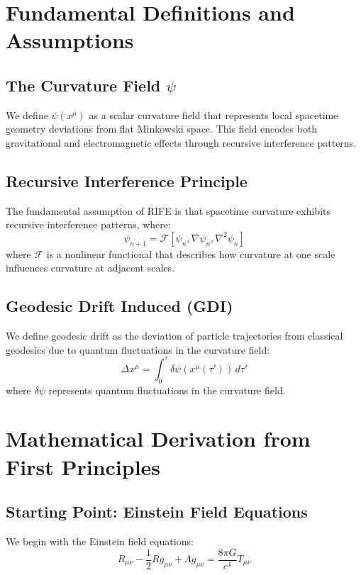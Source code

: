 \documentclass[11pt]{article}
\begin{document}
\section{Fundamental Definitions and Assumptions}

\subsection{The Curvature Field $\psi$}
We define $\psi(x^\mu)$ as a scalar curvature field that represents local spacetime geometry deviations from flat Minkowski space. This field encodes both gravitational and electromagnetic effects through recursive interference patterns.

\subsection{Recursive Interference Principle}
The fundamental assumption of RIFE is that spacetime curvature exhibits recursive interference patterns, where:
\begin{equation}
\psi_{n+1} = \mathcal{F}[\psi_n, \nabla\psi_n, \nabla^2\psi_n]
\end{equation}
where $\mathcal{F}$ is a nonlinear functional that describes how curvature at one scale influences curvature at adjacent scales.

\subsection{Geodesic Drift Induced (GDI)}
We define geodesic drift as the deviation of particle trajectories from classical geodesics due to quantum fluctuations in the curvature field:
\begin{equation}
\Delta x^\mu = \int_0^\tau \delta\psi(x^\mu(\tau')) \, d\tau'
\end{equation}
where $\delta\psi$ represents quantum fluctuations in the curvature field.

\section{Mathematical Derivation from First Principles}

\subsection{Starting Point: Einstein Field Equations}
We begin with the Einstein field equations:
\begin{equation}
R_{\mu\nu} - \frac{1}{2}Rg_{\mu\nu} + \Lambda g_{\mu\nu} = \frac{8\pi G}{c^4}T_{\mu\nu}
\end{equation}
\end{document}
